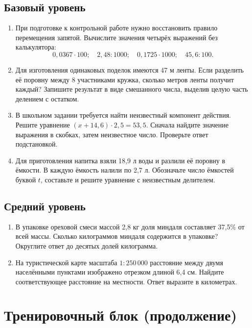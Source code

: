 \documentclass[a4paper,12pt]{article}
\begin{document}
\subsection{Базовый уровень}
\begin{enumerate}
\item При подготовке к контрольной работе нужно восстановить правило перемещения запятой. Вычислите значения четырёх выражений без калькулятора:
\[
0{,}0367\cdot100;\quad 2{,}48:1000;\quad
0{,}1725\cdot1000;\quad 45{,}6:100.
\]
\item Для изготовления одинаковых поделок имеются 47 м ленты. Если разделить её поровну между 8 участниками кружка, сколько метров ленты получит каждый? Запишите результат в виде смешанного числа, выделив целую часть делением с остатком.
\item В школьном задании требуется найти неизвестный компонент действия. Решите уравнение $(x+14{,}6)\cdot2{,}5=53{,}5$. Сначала найдите значение выражения в скобках, затем неизвестное число. Проверьте ответ подстановкой.
\item Для приготовления напитка взяли 18,9 л воды и разлили её поровну в ёмкости. В каждую ёмкость налили по 2,7 л. Обозначьте число ёмкостей буквой $t$, составьте и решите уравнение с неизвестным делителем.
\end{enumerate}
\subsection{Средний уровень}
\begin{enumerate}[start=5]
\item В упаковке ореховой смеси массой 2,8 кг доля миндаля составляет 37,5\% от всей массы. Сколько килограммов миндаля содержится в упаковке? Округлите ответ до десятых долей килограмма.
\item На туристической карте масштаба $1:250\,000$ расстояние между двумя населёнными пунктами изображено отрезком длиной 6,4 см. Найдите соответствующее расстояние на местности. Ответ выразите в километрах.
\end{enumerate}
\clearpage
\section*{Тренировочный блок (продолжение)}
\end{document}
